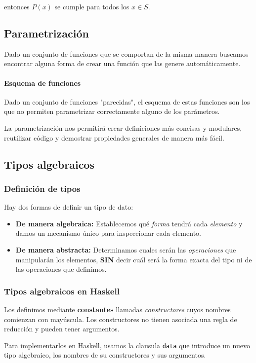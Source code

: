 \documentclass[10pt,a4paper]{article}
\begin{document}
entonces $P(x)$ se cumple para todos los $x\in S$.

\subsection{Parametrización}
Dado un conjunto de funciones que se comportan de la misma manera buscamos encontrar alguna forma de crear una función que las genere automáticamente. 

\paragraph{Esquema de funciones} Dado un conjunto de funciones "parecidas", el esquema de estas funciones son los que no permiten parametrizar correctamente alguno de los parámetros.

La parametrización nos permitirá crear definiciones más concisas y modulares, reutilizar código y demostrar propiedades generales de manera más fácil.

\subsection{Tipos algebraicos}

\subsubsection{Definición de tipos}
Hay dos formas de definir un tipo de dato:
\begin{itemize}
	\item \textbf{De manera algebraica:} Establecemos qué \textit{forma} tendrá cada \textit{elemento} y damos un mecanismo único para inspeccionar cada elemento.
	\item \textbf{De manera abstracta:} Determinamos cuales serán las \textit{operaciones} que manipularán los elementos, \textbf{SIN} decir cuál será la forma exacta del tipo ni de las operaciones que definimos.
\end{itemize}

\subsubsection{Tipos algebraicos en Haskell}
Los definimos mediante \textbf{constantes} llamadas \textit{constructores} cuyos nombres comienzan con mayúscula. Los constructores no tienen asociada una regla de reducción y pueden tener argumentos.

Para implementarlos en Haskell, usamos la clausula \texttt{data} que introduce un nuevo tipo algebraico, los nombres de su constructores y sus argumentos.
\end{document}
